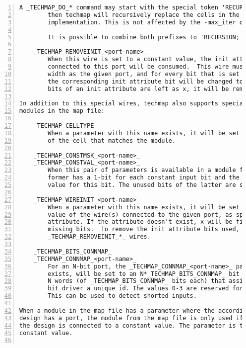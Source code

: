 \begin{lstlisting}[numbers=left,frame=single]
        A _TECHMAP_DO_* command may start with the special token 'RECURSION; '.
        then techmap will recursively replace the cells in the module with their
        implementation. This is not affected by the -max_iter option.

        It is possible to combine both prefixes to 'RECURSION; CONSTMAP; '.

    _TECHMAP_REMOVEINIT_<port-name>_
        When this wire is set to a constant value, the init attribute of the wire(s)
        connected to this port will be consumed.  This wire must have the same
        width as the given port, and for every bit that is set to 1 in the value,
        the corresponding init attribute bit will be changed to 1'bx.  If all
        bits of an init attribute are left as x, it will be removed.

In addition to this special wires, techmap also supports special parameters in
modules in the map file:

    _TECHMAP_CELLTYPE_
        When a parameter with this name exists, it will be set to the type name
        of the cell that matches the module.

    _TECHMAP_CONSTMSK_<port-name>_
    _TECHMAP_CONSTVAL_<port-name>_
        When this pair of parameters is available in a module for a port, then
        former has a 1-bit for each constant input bit and the latter has the
        value for this bit. The unused bits of the latter are set to undef (x).

    _TECHMAP_WIREINIT_<port-name>_
        When a parameter with this name exists, it will be set to the initial
        value of the wire(s) connected to the given port, as specified by the init
        attribute. If the attribute doesn't exist, x will be filled for the
        missing bits.  To remove the init attribute bits used, use the
        _TECHMAP_REMOVEINIT_*_ wires.

    _TECHMAP_BITS_CONNMAP_
    _TECHMAP_CONNMAP_<port-name>_
        For an N-bit port, the _TECHMAP_CONNMAP_<port-name>_ parameter, if it
        exists, will be set to an N*_TECHMAP_BITS_CONNMAP_ bit vector containing
        N words (of _TECHMAP_BITS_CONNMAP_ bits each) that assign each single
        bit driver a unique id. The values 0-3 are reserved for 0, 1, x, and z.
        This can be used to detect shorted inputs.

When a module in the map file has a parameter where the according cell in the
design has a port, the module from the map file is only used if the port in
the design is connected to a constant value. The parameter is then set to the
constant value.


\end{lstlisting}
